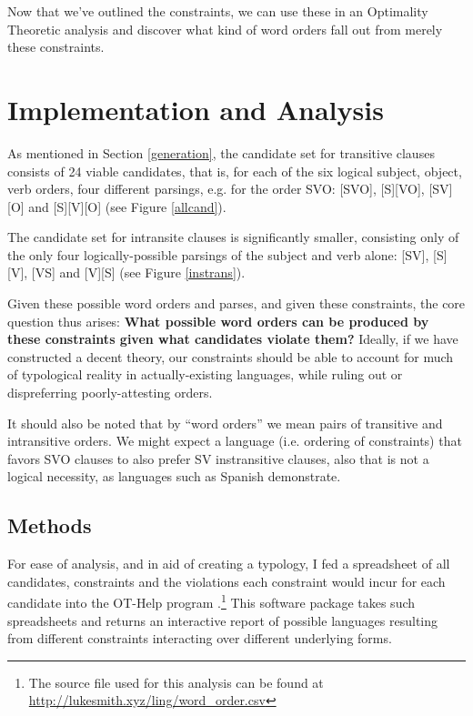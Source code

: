\documentclass{article}
\begin{document}
 Now that we've outlined the constraints, we can use these in an Optimality Theoretic analysis and discover what kind of word orders fall out from merely these constraints.

\section{Implementation and Analysis}


As mentioned in Section \ref{generation}, the candidate set for transitive clauses consists of 24 viable candidates, that is, for each of the six logical subject, object, verb orders, four different parsings, e.g. for the order SVO: [SVO], [S][VO], [SV][O] and [S][V][O] (see Figure \ref{allcand}).

The candidate set for intransite clauses is significantly smaller, consisting only of the only four logically-possible parsings of the subject and verb alone: [SV], [S][V], [VS] and [V][S] (see Figure \ref{instrans}).

Given these possible word orders and parses, and given these constraints, the core question thus arises: \textbf{What possible word orders  can be produced by these constraints given what candidates violate them?}
Ideally, if we have constructed a decent theory, our constraints should be able to account for much of typological reality in actually-existing languages, while ruling out or dispreferring poorly-attesting orders.

It should also be noted that by ``word orders'' we mean pairs of transitive and intransitive orders.
We might expect a language (i.e. ordering of constraints) that favors SVO clauses to also prefer SV instransitive clauses, also that is not a logical necessity, as languages such as Spanish demonstrate.

\subsection{Methods}

For ease of analysis, and in aid of creating a typology, I fed a spreadsheet of all candidates, constraints and the violations each constraint would incur for each candidate into the OT-Help program \parencite{othelp}.\footnote{The source file used for this analysis can be found at \href{http://lukesmith.xyz/ling/word_order.csv}{http://lukesmith.xyz/ling/word\_order.csv}} This software package takes such spreadsheets and returns an interactive report of possible languages resulting from different constraints interacting over different underlying forms.
\end{document}
